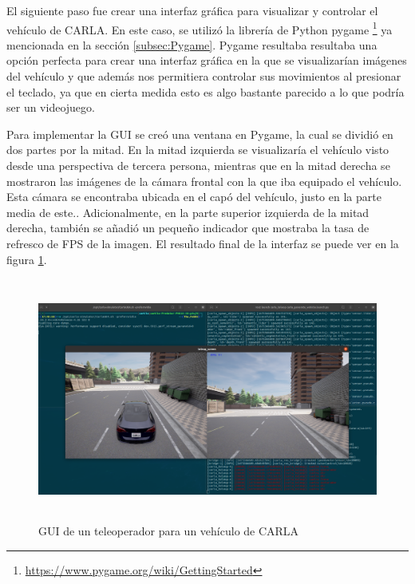 El siguiente paso fue crear una interfaz gráfica para visualizar y controlar el vehículo de CARLA. En este caso, se utilizó la librería de Python pygame \footnote{\url{https://www.pygame.org/wiki/GettingStarted}} ya mencionada en la sección \ref{subsec:Pygame}. Pygame resultaba resultaba una opción perfecta para crear una interfaz gráfica en la que se visualizarían imágenes del vehículo y que además nos permitiera controlar sus movimientos al presionar el teclado, ya que en cierta medida esto es algo bastante parecido a lo que podría ser un videojuego.

\bigskip

Para implementar  la \ac{GUI} se creó una ventana en Pygame, la cual se dividió en dos partes por la mitad. En la mitad izquierda se visualizaría el vehículo visto desde una perspectiva de tercera persona, mientras que en la mitad derecha se mostraron las imágenes de la cámara frontal con la que iba equipado el vehículo. Esta cámara se encontraba ubicada en el capó del vehículo, justo en la parte media de este.. Adicionalmente, en la parte superior izquierda de la mitad derecha, también se añadió un pequeño indicador que mostraba la tasa de refresco de \ac{FPS} de la imagen. El resultado final de la interfaz se puede ver en la figura \ref{fig: GUI de un teleoperador para un vehículo de CARLA}.

\begin{figure}[h]
    \centering
    \includegraphics[height=8cm]{imagenes/cap4/vehicle_teleop_hmi.png}
    \caption{GUI de un teleoperador para un vehículo de CARLA}
    \label{fig: GUI de un teleoperador para un vehículo de CARLA}
\end{figure}

\bigskip

